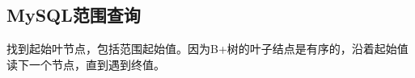 \documentclass[../../../interview-questions.tex]{subfiles}
\begin{document}
\subsection{MySQL范围查询}

找到起始叶节点，包括范围起始值。因为B+树的叶子结点是有序的，沿着起始值读下一个节点，直到遇到终值。
\end{document}
